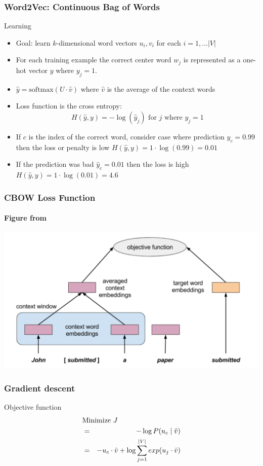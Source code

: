 \begin{frame}
\frametitle{Word2Vec: Continuous Bag of Words}
\begin{block}{Learning}
\begin{itemize}[<+->]
	\item Goal: learn $k$-dimensional word vectors $u_i, v_i$ for each $i = 1, \ldots |V|$
	\item For each training example the correct center word $w_j$ is represented as a one-hot vector $y$ where $y_j = 1$.
	\item $\hat{y} = \textrm{softmax}(U \cdot \hat{v})$ where $\hat{v}$ is the average of the context words
	\item Loss function is the cross entropy:
	\[ H(\hat{y}, y) = - \log(\hat{y}_j) \textrm{ for $j$ where $y_j = 1$} \]
	\item If $c$ is the index of the correct word, consider case where prediction $\hat{y}_c = 0.99$ then the loss or penalty is low $H(\hat{y}, y) = 1 \cdot \log(0.99) = 0.01$
	\item If the prediction was bad $\hat{y}_c = 0.01$ then the loss is high $H(\hat{y}, y) = 1 \cdot \log(0.01) = 4.6$
\end{itemize}	
\end{block}
\end{frame}

\begin{frame}
\frametitle{CBOW Loss Function}
\framesubtitle{Figure from \cite{melamud16}}
\includegraphics[scale=.45]{figures/wordvectors/cbowloss}	
\end{frame}

\begin{frame}
\frametitle{Gradient descent}
\begin{block}{Objective function}
\begin{eqnarray*}
\lefteqn{\textrm{Minimize } J } \\
& = & - \log P(u_c \mid \hat{v}) \\
& = & - u_c \cdot \hat{v} + \log \sum_{j=1}^{|V|} exp(u_j \cdot \hat{v})
\end{eqnarray*}
\end{block}
\end{frame}


